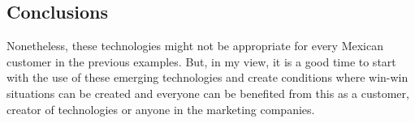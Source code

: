\documentclass[10pt]{article}
\begin{document}
\subsection{Conclusions}
Nonetheless, these technologies might not be appropriate
for every Mexican customer in the previous examples.
But, in my view, it is a good time to start with the use of 
these emerging technologies and create conditions where
win-win situations can be created and everyone can be 
benefited from this as a customer, creator of technologies or 
anyone in the marketing companies.
\end{document}
